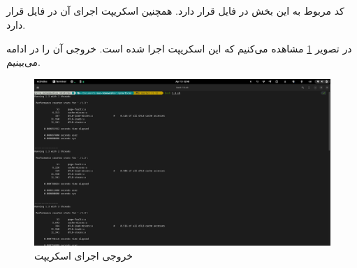 \documentclass{article}
\begin{document}
\subsubsection{}
\subsubsection{}
\subsection{}
\subsubsection{}
کد مربوط به این بخش در فایل 
قرار دارد. همچنین اسکریپت اجرای آن در فایل 
قرار دارد.

در تصویر 
\ref{fig:1.3}
مشاهده می‌کنیم که این اسکریپت اجرا شده است. 
خروجی آن را در ادامه می‌بینیم. 

\begin{figure}[H]
\centering
\includegraphics[width=\textwidth]{1.3.png}
\caption{خروجی اجرای اسکریپت}
\label{fig:1.3}
\end{figure}
\end{document}
